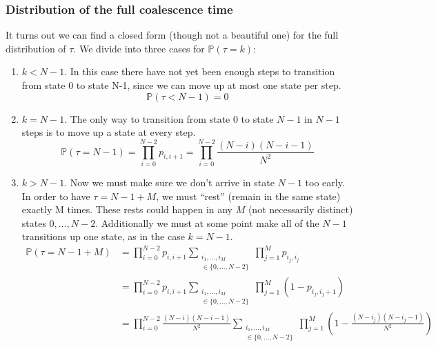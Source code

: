 \documentclass{article}
\newcommand{\PR}{\mathbb{P}}
\begin{document}
\subsubsection*{Distribution of the full coalescence time}
It turns out we can find a closed form (though not a beautiful one) for the full distribution of $\tau$. We divide into three cases for $\PR(\tau=k)$:
\begin{enumerate}
\item $k<N-1$. In this case there have not yet been enough steps to transition from state 0 to state N-1, since we can move up at most one state per step.
\begin{equation*}
\PR(\tau<N-1)=0
\end{equation*}

\item $k=N-1$. The only way to transition from state 0 to state $N-1$ in $N-1$ steps is to move up a state at every step. 
\begin{equation*}
\PR(\tau=N-1) = \prod_{i=0}^{N-2} p_{i,i+1} = \prod_{i=0}^{N-2} \frac{(N-i)(N-i-1)}{N^2}
\end{equation*}

\item $k>N-1$. Now we must make sure we don't arrive in state $N-1$ too early. In order to have $\tau=N-1+M$, we must ``rest'' (remain in the same state) exactly M times. These rests could happen in any $M$ (not necessarily distinct) states $0,\dots,N-2$. Additionally we must at some point make all of the $N-1$ transitions up one state, as in the case $k=N-1$.
\begin{align*}
\PR(\tau=N-1+M) &= \prod_{i=0}^{N-2} p_{i,i+1} \sum_{\substack{i_1,\dots,i_M\\ \in \{0,\dots,N-2\}}} \prod_{j=1}^M p_{i_j,i_j} \\
&= \prod_{i=0}^{N-2} p_{i,i+1} \sum_{\substack{i_1,\dots,i_M\\ \in \{0,\dots,N-2\}}} \prod_{j=1}^M (1-p_{i_j,i_j+1}) \\
&= \prod_{i=0}^{N-2} \frac{(N-i)(N-i-1)}{N^2} \sum_{\substack{i_1,\dots,i_M\\ \in \{0,\dots,N-2\}}} \prod_{j=1}^M \left(1-\frac{(N-i_j)(N-i_j-1)}{N^2}\right)
\end{align*}
\end{enumerate}
\end{document}
